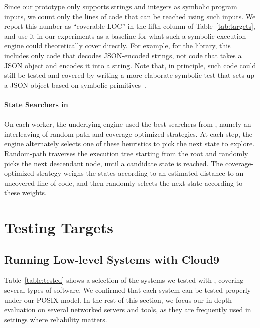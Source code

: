 Since our \chef prototype only supports strings and integers as symbolic program inputs, we count only the lines of code that can be reached using such inputs. We report this number as ``coverable LOC'' in the fifth column of Table~\ref{tab:targets}, and use it in our experiments as a baseline for what such a symbolic execution engine could theoretically cover directly.  For example, for the  library, this includes only code that decodes JSON-encoded strings, not code that takes a JSON object and encodes it into a string. Note that, in principle, such code could still be tested and covered by writing a more elaborate symbolic test that sets up a JSON object based on symbolic primitives~\cite{paas-testing}.

\paragraph{State Searchers in \cnine}

On each worker, the underlying \klee engine used the best searchers from \cite{klee}, namely an interleaving of random-path and coverage-optimized strategies. At each step, the engine alternately selects one of these heuristics to pick the next state to explore. Random-path traverses the execution tree starting from the root and randomly picks the next descendant node, until a candidate state is reached. The coverage-optimized strategy weighs the states according to an estimated distance to an uncovered line of code, and then randomly selects the next state according to these weights.


\section{Testing Targets}
\label{sec:eval:targets}

\subsection{Running Low-level Systems with Cloud9}

Table~\ref{table:tested} shows a selection of the systems we tested with \cnine, covering several types of software.  We confirmed that each system can be tested properly under our POSIX model. In the rest of this section, we focus our in-depth evaluation on several networked servers and tools, as they are frequently used in settings where reliability matters.

